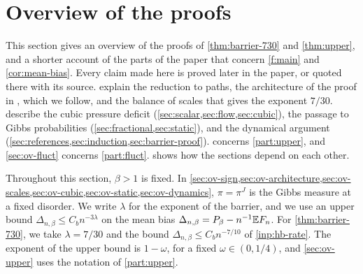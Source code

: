 \chapter{Overview of the proofs}\label{sec:overview}

This section gives an overview of the proofs of \cref{thm:barrier-730} and
\cref{thm:upper}, and a shorter account of the parts of the paper that concern
\cref{f:main} and \cref{cor:mean-bias}. Every claim made here is proved later in
the paper, or quoted there with its source.
 explain the reduction to
paths, the architecture of the proof in \cite{oai-barriers}, which we follow,
and the balance of scales that gives the exponent $7/30$.
 describe the cubic pressure
deficit (\cref{sec:scalar,sec:flow,sec:cubic}), the passage to Gibbs
probabilities (\cref{sec:fractional,sec:static}), and the dynamical argument
(\cref{sec:references,sec:induction,sec:barrier-proof}). 
concerns \cref{part:upper}, and \cref{sec:ov-fluct} concerns
\cref{part:fluct}.  shows how the sections depend on
each other.

Throughout this section, $\beta>1$ is fixed. In
\cref{sec:ov-sign,sec:ov-architecture,sec:ov-scales,sec:ov-cubic,sec:ov-static,sec:ov-dynamics},
$\pi=\pi^J$ is the Gibbs measure at a fixed disorder. We write $\lambda$ for
the exponent of the barrier, and we use an upper bound
$\Delta_{n,\beta}\le C_bn^{-3\lambda}$ on the mean bias
$\Delta_{n,\beta}=P_\beta-n^{-1}\mathbb E F_n$. For \cref{thm:barrier-730}, we take
$\lambda=7/30$ and the bound $\Delta_{n,\beta}\le C_bn^{-7/10}$ of
\cref{inp:hb-rate}. The exponent of the upper bound is $1-\omega$, for a fixed
$\omega\in(0,1/4)$, and \cref{sec:ov-upper} uses the notation of
\cref{part:upper}.

